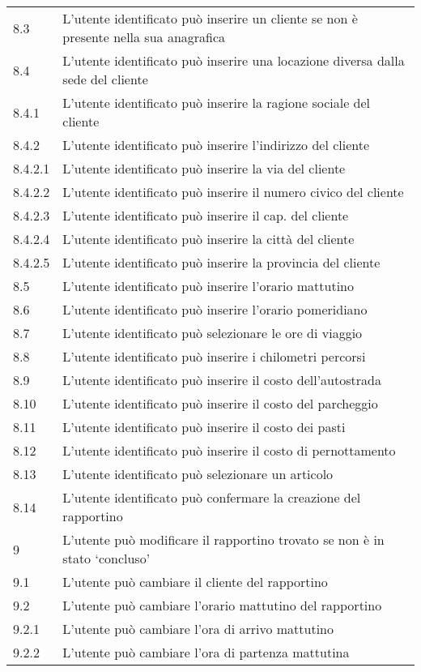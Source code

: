 \begin{longtable}{||p{} p{10.55cm}||}
		8.3 & L’utente identificato può inserire un cliente se non è presente nella sua anagrafica\\
		8.4 & L’utente identificato può inserire una locazione diversa dalla sede del cliente\\
		8.4.1 & L’utente identificato può inserire la ragione sociale del cliente\\
		8.4.2 & L’utente identificato può inserire l’indirizzo del cliente\\
		8.4.2.1 & L’utente identificato può inserire la via del cliente\\
		8.4.2.2 & L’utente identificato può inserire il numero civico del cliente\\
		8.4.2.3 & L’utente identificato può inserire il cap. del cliente \\
		8.4.2.4 & L’utente identificato può inserire la città del cliente\\
		8.4.2.5 & L’utente identificato può inserire la provincia del cliente\\
		8.5 & L’utente identificato può inserire l’orario mattutino\\
		8.6 & L’utente identificato può inserire l’orario pomeridiano\\
		8.7 & L’utente identificato può selezionare le ore di viaggio\\
		8.8 & L’utente identificato può inserire i chilometri percorsi\\
		8.9 & L’utente identificato può inserire il costo dell’autostrada\\
		8.10 & L’utente identificato può inserire il costo del parcheggio\\
		8.11 & L’utente identificato può inserire il costo dei pasti\\
		8.12 & L’utente identificato può inserire il costo di pernottamento\\
		8.13 & L’utente identificato può selezionare un articolo\\
		8.14 & L’utente identificato può confermare la creazione del rapportino\\
		\hline
		9 & L’utente può modificare il rapportino trovato se non è in stato ‘concluso’\\
		9.1 & L’utente può cambiare il cliente del rapportino\\
		9.2 & L’utente può cambiare l’orario mattutino del rapportino\\
		9.2.1 & L’utente può cambiare l’ora di arrivo mattutino\\
		9.2.2 & L’utente può cambiare l’ora di partenza mattutina\\

\end{longtable}
